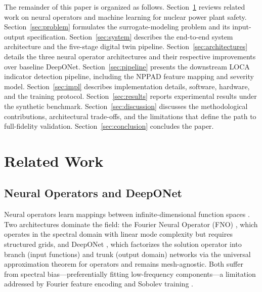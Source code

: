 \documentclass[journal]{IEEEtran}
\begin{document}
The remainder of this paper is organized as follows. Section~\ref{sec:related} reviews related work on neural operators and machine learning for nuclear power plant safety. Section~\ref{sec:problem} formulates the surrogate-modeling problem and its input-output specification. Section~\ref{sec:system} describes the end-to-end system architecture and the five-stage digital twin pipeline. Section~\ref{sec:architectures} details the three neural operator architectures and their respective improvements over baseline DeepONet. Section~\ref{sec:pipeline} presents the downstream LOCA indicator detection pipeline, including the NPPAD feature mapping and severity model. Section~\ref{sec:impl} describes implementation details, software, hardware, and the training protocol. Section~\ref{sec:results} reports experimental results under the synthetic benchmark. Section~\ref{sec:discussion} discusses the methodological contributions, architectural trade-offs, and the limitations that define the path to full-fidelity validation. Section~\ref{sec:conclusion} concludes the paper.

\section{Related Work}
\label{sec:related}

\subsection{Neural Operators and DeepONet}
Neural operators learn mappings between infinite-dimensional function spaces \cite{lu2022comprehensive}. Two architectures dominate the field: the Fourier Neural Operator (FNO) \cite{li2021fno}, which operates in the spectral domain with linear mode complexity but requires structured grids, and DeepONet \cite{lu2021deeponet, chen1995}, which factorizes the solution operator into branch (input functions) and trunk (output domain) networks via the universal approximation theorem for operators and remains mesh-agnostic. Both suffer from spectral bias---preferentially fitting low-frequency components---a limitation addressed by Fourier feature encoding \cite{tancik2020ffn} and Sobolev training \cite{son2021sobolev}.
\end{document}
